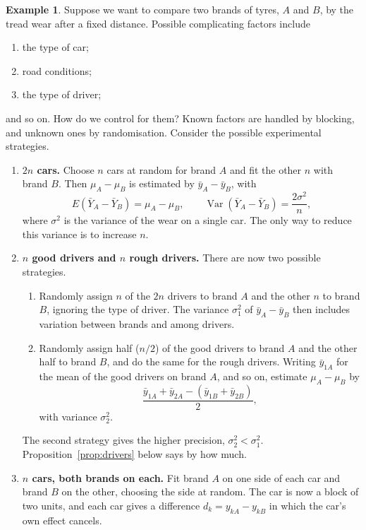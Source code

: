 \documentclass[11pt,a4paper]{article}
\numberwithin{equation}{section}
\DeclareMathOperator{\Var}{Var}
\theoremstyle{definition}
\newtheorem{exa}[thm]{Example}
\begin{document}
\begin{exa}\label{exa:tyres}
Suppose we want to compare two brands of tyres, $A$ and $B$, by the tread wear after a fixed distance. Possible complicating factors include
\begin{enumerate}[label=(\roman*)]
\item the type of car;
\item road conditions;
\item the type of driver;
\end{enumerate}
and so on. How do we control for them? Known factors are handled by blocking, and unknown ones by randomisation. Consider the possible
experimental strategies.

\begin{enumerate}[label=(\alph*)]
\item \textbf{$2n$ cars.} Choose $n$ cars at random for brand $A$ and fit the other $n$ with brand $B$. Then $\mu_A - \mu_B$ is estimated by
$\bar y_A - \bar y_B$, with
\[
E(\bar Y_A - \bar Y_B) = \mu_A - \mu_B , \qquad \Var(\bar Y_A - \bar Y_B) = \frac{2\sigma^2}{n} ,
\]
where $\sigma^2$ is the variance of the wear on a single car. The only way to reduce this variance is to increase $n$.

\item \textbf{$n$ good drivers and $n$ rough drivers.} There are now two possible strategies.
\begin{enumerate}[label=(\roman*)]
\item Randomly assign $n$ of the $2n$ drivers to brand $A$ and the other $n$ to brand $B$, ignoring the type of driver. The variance $\sigma_1^2$ of
$\bar y_A - \bar y_B$ then includes variation between brands and among drivers.
\item Randomly assign half ($n/2$) of the good drivers to brand $A$ and the other half to brand $B$, and do the same for the rough drivers.
Writing $\bar y_{1A}$ for the mean of the good drivers on brand $A$, and so on, estimate $\mu_A - \mu_B$ by
\[
\frac{\bar y_{1A} + \bar y_{2A} - (\bar y_{1B} + \bar y_{2B})}{2} ,
\]
with variance $\sigma_2^2$.
\end{enumerate}
The second strategy gives the higher precision, $\sigma_2^2 < \sigma_1^2$. Proposition~\ref{prop:drivers} below says by how much.

\item \textbf{$n$ cars, both brands on each.} Fit brand $A$ on one side of each car and brand $B$ on the other, choosing the side at random. The
car is now a block of two units, and each car gives a difference $d_k = y_{kA} - y_{kB}$ in which the car's own effect cancels.
\end{enumerate}
\end{exa}
\end{document}

